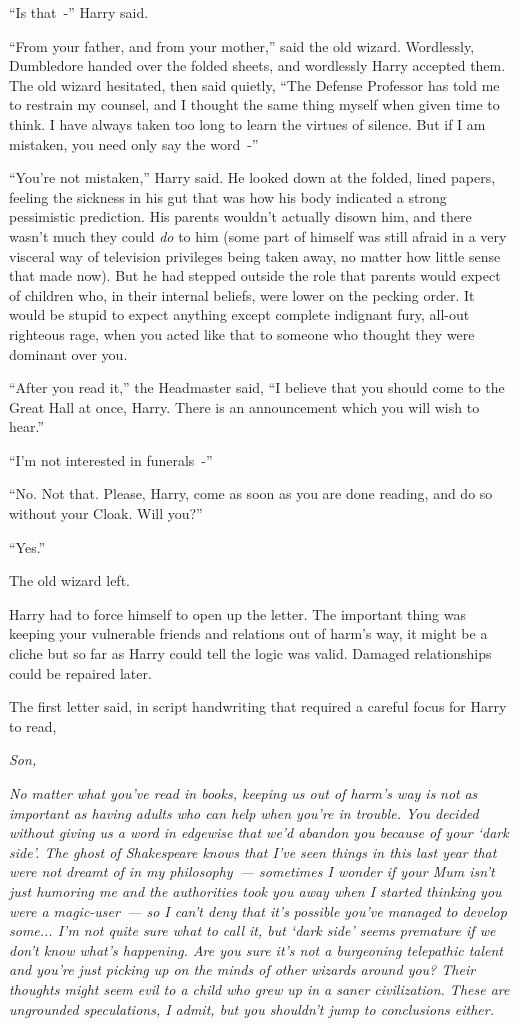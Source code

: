 ``Is that~-'' Harry said.

``From your father, and from your mother,'' said the old wizard. Wordlessly, Dumbledore handed over the folded sheets, and wordlessly Harry accepted them. The old wizard hesitated, then said quietly, ``The Defense Professor has told me to restrain my counsel, and I thought the same thing myself when given time to think. I have always taken too long to learn the virtues of silence. But if I am mistaken, you need only say the word~-''

``You're not mistaken,'' Harry said. He looked down at the folded, lined papers, feeling the sickness in his gut that was how his body indicated a strong pessimistic prediction. His parents wouldn't actually disown him, and there wasn't much they could \emph{do} to him (some part of himself was still afraid in a very visceral way of television privileges being taken away, no matter how little sense that made now). But he had stepped outside the role that parents would expect of children who, in their internal beliefs, were lower on the pecking order. It would be stupid to expect anything except complete indignant fury, all-out righteous rage, when you acted like that to someone who thought they were dominant over you.

``After you read it,'' the Headmaster said, ``I believe that you should come to the Great Hall at once, Harry. There is an announcement which you will wish to hear.''

``I'm not interested in funerals~-''

``No. Not that. Please, Harry, come as soon as you are done reading, and do so without your Cloak. Will you?''

``Yes.''

The old wizard left.

Harry had to force himself to open up the letter. The important thing was keeping your vulnerable friends and relations out of harm's way, it might be a cliche but so far as Harry could tell the logic was valid. Damaged relationships could be repaired later.

The first letter said, in script handwriting that required a careful focus for Harry to read,

\emph{Son,}

\emph{No matter what you've read in books, keeping us out of harm's way is} \emph{not} \emph{as important as having adults who can help when you're in trouble. You decided without giving us a word in edgewise that we'd abandon you because of your `dark side'. The ghost of Shakespeare knows that I've seen things in this last year that were not dreamt of in my philosophy~--- sometimes I wonder if your Mum isn't just humoring me and the authorities took you away when I started thinking you were a magic-user~--- so I can't deny that it's} \emph{possible} \emph{you've managed to develop some... I'm not quite sure what to call it, but `dark side' seems premature if we don't know what's happening. Are you sure it's not a burgeoning telepathic talent and you're just picking up on the minds of other wizards around you? Their thoughts might seem evil to a child who grew up in a saner civilization. These are ungrounded speculations, I admit, but you shouldn't jump to conclusions either.}

